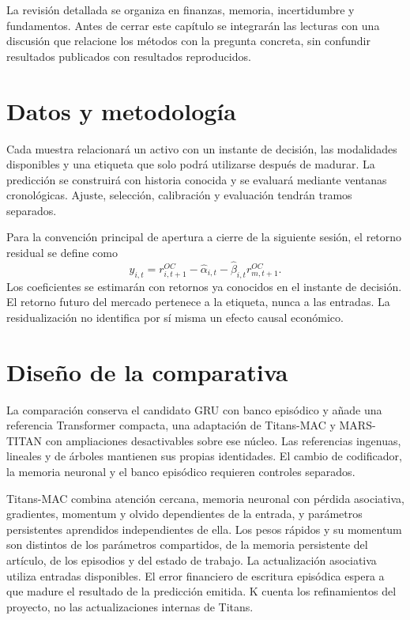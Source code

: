 \documentclass[11pt,a4paper]{report}
\begin{document}
La revisión detallada se organiza en finanzas, memoria, incertidumbre y fundamentos.
Antes de cerrar este capítulo se integrarán las lecturas con una discusión que
relacione los métodos con la pregunta concreta, sin confundir resultados publicados
con resultados reproducidos.

\chapter{Datos y metodología}
Cada muestra relacionará un activo con un instante de decisión, las modalidades
disponibles y una etiqueta que solo podrá utilizarse después de madurar. La
predicción se construirá con historia conocida y se evaluará mediante ventanas
cronológicas. Ajuste, selección, calibración y evaluación tendrán tramos separados.

Para la convención principal de apertura a cierre de la siguiente sesión,
el retorno residual se define como
\begin{equation}
y_{i,t} = r^{OC}_{i,t+1} - \hat\alpha_{i,t}
          - \hat\beta_{i,t} r^{OC}_{m,t+1}.
\end{equation}
Los coeficientes se estimarán con retornos ya conocidos en el instante de decisión.
El retorno futuro del mercado pertenece a la etiqueta, nunca a las entradas.
La residualización no identifica por sí misma un efecto causal económico.

\chapter{Diseño de la comparativa}
La comparación conserva el candidato GRU con banco episódico y añade una
referencia Transformer compacta, una adaptación de Titans-MAC y MARS-TITAN con
ampliaciones desactivables sobre ese núcleo. Las referencias ingenuas, lineales
y de árboles mantienen sus propias identidades. El cambio de codificador,
la memoria neuronal y el banco episódico requieren controles separados.

Titans-MAC combina atención cercana, memoria neuronal con pérdida asociativa,
gradientes, momentum y olvido dependientes de la entrada, y parámetros
persistentes aprendidos independientes de ella. Los pesos rápidos y su momentum
son distintos de los parámetros compartidos, de la memoria persistente del
artículo, de los episodios y del estado de trabajo. La actualización asociativa
utiliza entradas disponibles. El error financiero de escritura episódica espera
a que madure el resultado de la predicción emitida. K cuenta los refinamientos
del proyecto, no las actualizaciones internas de Titans.
\end{document}
